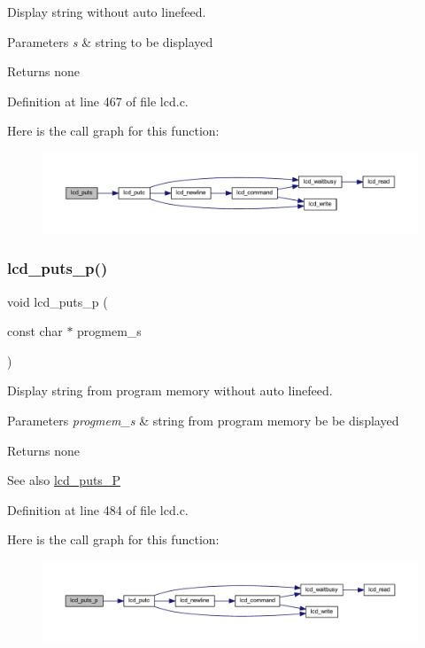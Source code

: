 Display string without auto linefeed. 


\begin{DoxyParams}{Parameters}
{\em s} & string to be displayed\\
\hline
\end{DoxyParams}
\begin{DoxyReturn}{Returns}
none 
\end{DoxyReturn}


Definition at line 467 of file lcd.\+c.

Here is the call graph for this function\+:\nopagebreak
\begin{figure}[H]
\begin{center}
\leavevmode
\includegraphics[width=350pt]{group__pfleury__lcd_ga8ffdfcac7638368ff04364c14984266e_cgraph}
\end{center}
\end{figure}
\mbox{\label{group__pfleury__lcd_ga9022a24a56a9b15681f62eb6ba77e5de}} 
\subsubsection{\texorpdfstring{lcd\_puts\_p()}{lcd\_puts\_p()}}
{\footnotesize\ttfamily void lcd\+\_\+puts\+\_\+p (\begin{DoxyParamCaption}\item[{const char $\ast$}]{progmem\+\_\+s }\end{DoxyParamCaption})}



Display string from program memory without auto linefeed. 


\begin{DoxyParams}{Parameters}
{\em progmem\+\_\+s} & string from program memory be be displayed\\
\hline
\end{DoxyParams}
\begin{DoxyReturn}{Returns}
none 
\end{DoxyReturn}
\begin{DoxySeeAlso}{See also}
\mbox{\hyperlink{group__pfleury__lcd_ga4f1928f1515e21422d5a33af2949f2f7}{lcd\+\_\+puts\+\_\+P}} 
\end{DoxySeeAlso}


Definition at line 484 of file lcd.\+c.

Here is the call graph for this function\+:\nopagebreak
\begin{figure}[H]
\begin{center}
\leavevmode
\includegraphics[width=350pt]{group__pfleury__lcd_ga9022a24a56a9b15681f62eb6ba77e5de_cgraph}
\end{center}
\end{figure}
